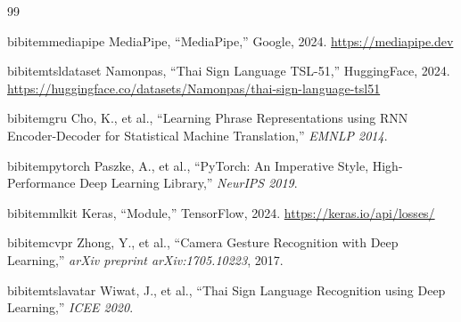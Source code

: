 \documentclass[12pt,a4paper]{report}
\begin{document}
\begin{thebibliography}{99}

bibitem{mediapipe}
MediaPipe, ``MediaPipe,'' Google, 2024. 
\url{https://mediapipe.dev}

bibitem{tsldataset}
Namonpas, ``Thai Sign Language TSL-51,'' HuggingFace, 2024.
\url{https://huggingface.co/datasets/Namonpas/thai-sign-language-tsl51}

bibitem{gru}
Cho, K., et al., ``Learning Phrase Representations using RNN Encoder-Decoder for Statistical Machine Translation,''
\textit{EMNLP 2014}.

bibitem{pytorch}
Paszke, A., et al., ``PyTorch: An Imperative Style, High-Performance Deep Learning Library,''
\textit{NeurIPS 2019}.

bibitem{mlkit}
Keras, ``Module,'' TensorFlow, 2024.
\url{https://keras.io/api/losses/}

bibitem{cvpr}
Zhong, Y., et al., ``Camera Gesture Recognition with Deep Learning,'' 
\textit{arXiv preprint arXiv:1705.10223}, 2017.

bibitem{tslavatar}
Wiwat, J., et al., ``Thai Sign Language Recognition using Deep Learning,'' 
\textit{ICEE 2020}.

\end{thebibliography}
\end{document}
